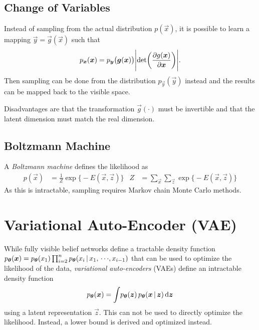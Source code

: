 		\subsection{Change of Variables}
			Instead of sampling from the actual distribution \( p(\vec{x}) \), it is possible to learn a mapping \( \vec{y} = \vec{g}(\vec{x}) \) such that
			\begin{equation}
				p_{\bm{x}}(\bm{x}) = p_{\bm{y}}\big( \bm{g}(\bm{x}) \big) \Biggl\lvert \det\biggl( \pdv{g(\bm{x})}{\bm{x}} \biggr) \Biggr\rvert.
			\end{equation}
			Then sampling can be done from the distribution \( p_{\vec{y}}(\vec{y}) \) instead and the results can be mapped back to the visible space.

			Disadvantages are that the transformation \(\vec{g}(\cdot)\) must be invertible and that the latent dimension must match the real dimension.

		\subsection{Boltzmann Machine}
			A \emph{Boltzmann machine} defines the likelihood as
			\begin{align}
				p(\vec{x}) & = \frac{1}{Z} \exp\bigl\{ -E(\vec{x}, \vec{z}) \bigr\}                   &
				Z          & = \sum_{\vec{x}} \sum_{\vec{z}} \exp\bigl\{ -E(\vec{x}, \vec{z}) \bigr\}
			\end{align}
			As this is intractable, sampling requires Markov chain Monte Carlo methods.

	\section{Variational Auto-Encoder (VAE)}
		\label{sec:vae}

		While fully visible belief networks define a tractable density function \( p_{\bm{\theta}}(\bm{x}) = p_{\bm{\theta}}(x_1) \prod_{i = 2}^{n} p_{\bm{\theta}}(x_i \,\vert\, x_1,\,\cdots\!,x_{i - 1}) \) that can be used to optimize the likelihood of the data, \emph{variational auto-encoders} (VAEs) define an intractable density function
		\begin{equation}
			p_{\bm{\theta}}(\bm{x}) = \int\! p_{\bm{\theta}}(\bm{z}) \, p_{\bm{\theta}}(\bm{x} \,\vert\, \bm{z}) \dd{\bm{z}}
		\end{equation}
		using a latent representation \(\vec{z}\). This can not be used to directly optimize the likelihood. Instead, a lower bound is derived and optimized instead.

